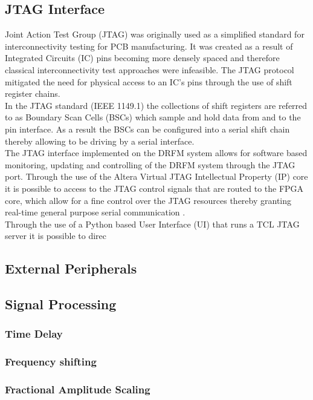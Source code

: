 	\subsection{JTAG Interface}
		\noindent Joint Action Test Group (JTAG) was originally used as a simplified standard for interconnectivity testing for PCB manufacturing. It was created as a result of Integrated Circuits (IC) pins becoming more densely spaced and therefore classical interconnectivity test approaches were infeasible. The JTAG protocol mitigated the need for physical access to an IC's pins through the use of shift register chains.  \\ \newline In the JTAG standard (IEEE 1149.1) the collections of shift registers are referred to as Boundary Scan Cells (BSCs) which sample and hold data from and to the pin interface. As a result the BSCs can be configured into a serial shift chain thereby allowing to be driving by a serial interface. \\ \newline 	The JTAG interface implemented on the DRFM system allows for software based monitoring, updating and controlling of the DRFM system through the JTAG port.  Through the use of the Altera Virtual JTAG Intellectual Property (IP) core it is possible to access to the JTAG control signals that are routed to the FPGA core, which allow for a fine control over the JTAG resources thereby granting real-time general purpose serial communication \cite{JTAG}. \\ \newline	Through the use of  a Python based User Interface (UI) that runs a TCL JTAG server it is possible to direc
		
	
	\subsection{External Peripherals}
	
	\subsection{Signal Processing}
	
	\subsubsection{Time Delay}
	
	\subsubsection{Frequency shifting}
	
	\subsubsection{Fractional Amplitude Scaling}

	
	



